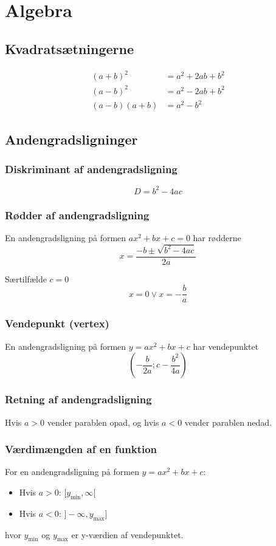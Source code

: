 \section{Algebra}
\subsection{Kvadratsætningerne}
\begin{align*}
    (a+b)^2 &= a^2 + 2ab + b^2 \\
    (a-b)^2 &= a^2 - 2ab + b^2 \\
    (a-b)(a+b) &= a^2 - b^2
\end{align*}

\subsection{Andengradsligninger}

\subsubsection{Diskriminant af andengradsligning}
\[
    D = b^2 - 4ac
\]

\subsubsection{Rødder af andengradsligning}
En andengradsligning på formen \( a x^2 + b x + c = 0 \) har rødderne
\[
    x = \frac{-b \pm \sqrt{b^2 - 4ac}}{2a}
\]

Særtilfælde $c=0$
\[
    x = 0 \lor x = -\frac{b}{a}
\]

\subsubsection{Vendepunkt (vertex)}
En andengradsligning på formen \( y = a x^2 + b x + c \) har vendepunktet
\[
    \left( -\frac{b}{2a}; c - \frac{b^2}{4a} \right)
\]

\subsubsection{Retning af andengradsligning}
Hvis \( a > 0 \) vender parablen opad, og hvis \( a < 0 \) vender parablen nedad.

\subsubsection{Værdimængden af en funktion}
For en andengradsligning på formen \( y = a x^2 + b x + c \):
\begin{itemize}
    \item Hvis \( a > 0 \): \( [y_{\text{min}}, \infty[ \)
    \item Hvis \( a < 0 \): \( ]-\infty, y_{\text{max}}] \)
\end{itemize}
hvor \( y_{\text{min}} \) og \( y_{\text{max}} \) er y-værdien af vendepunktet.